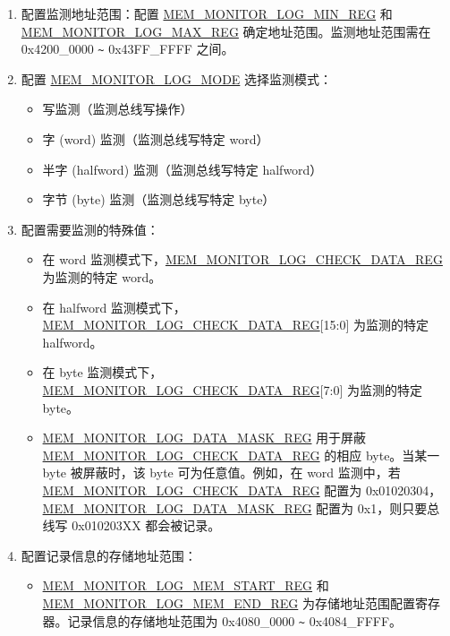 \documentclass[main\_\_CN.tex]{subfiles}
\begin{document}
\begin{enumerate}
    \item 配置监测地址范围：配置 \hyperref[regdesc:MEMMONITORLOGMINREG]{MEM\_MONITOR\_LOG\_MIN\_REG} 和 \hyperref[regdesc:MEMMONITORLOGMAXREG]{MEM\_MONITOR\_LOG\_MAX\_REG} 确定地址范围。监测地址范围需在 0x4200\_0000 \verb+~+ 0x43FF\_FFFF 之间。
    \item 配置 \hyperref[fielddesc:MEMMONITORLOGMODE]{MEM\_MONITOR\_LOG\_MODE} 选择监测模式：
        \begin{itemize}
            \item 写监测（监测总线写操作）
            \item 字 (word) 监测（监测总线写特定 word）
            \item 半字 (halfword) 监测（监测总线写特定 halfword）
            \item 字节 (byte) 监测（监测总线写特定 byte）
        \end{itemize}
    \item 配置需要监测的特殊值：
        \begin{itemize}
            \item 在 word 监测模式下，\hyperref[regdesc:MEMMONITORLOGCHECKDATAREG]{MEM\_MONITOR\_LOG\_CHECK\_DATA\_REG} 为监测的特定 word。
            \item 在 halfword 监测模式下，\hyperref[regdesc:MEMMONITORLOGCHECKDATAREG]{MEM\_MONITOR\_LOG\_CHECK\_DATA\_REG}[15:0] 为监测的特定 halfword。
            \item 在 byte 监测模式下，\hyperref[regdesc:MEMMONITORLOGCHECKDATAREG]{MEM\_MONITOR\_LOG\_CHECK\_DATA\_REG}[7:0] 为监测的特定 byte。
            \item \hyperref[regdesc:MEMMONITORLOGDATAMASKREG]{MEM\_MONITOR\_LOG\_DATA\_MASK\_REG} 用于屏蔽 \hyperref[regdesc:MEMMONITORLOGCHECKDATAREG]{MEM\_MONITOR\_LOG\_CHECK\_DATA\_REG} 的相应 byte。当某一 byte 被屏蔽时，该 byte 可为任意值。例如，在 word 监测中，若 \hyperref[regdesc:MEMMONITORLOGCHECKDATAREG]{MEM\_MONITOR\_LOG\_CHECK\_DATA\_REG} 配置为 0x01020304，\hyperref[regdesc:MEMMONITORLOGDATAMASKREG]{MEM\_MONITOR\_LOG\_DATA\_MASK\_REG} 配置为 0x1，则只要总线写 0x010203XX 都会被记录。
        \end{itemize}
    \item 配置记录信息的存储地址范围：
        \begin{itemize}
            \item \hyperref[regdesc:MEMMONITORLOGMEMSTARTREG]{MEM\_MONITOR\_LOG\_MEM\_START\_REG} 和 \hyperref[regdesc:MEMMONITORLOGMEMENDREG]{MEM\_MONITOR\_LOG\_MEM\_END\_REG} 为存储地址范围配置寄存器。记录信息的存储地址范围为 0x4080\_0000 \verb+~+ 0x4084\_FFFF。

\end{itemize}
\end{enumerate}
\end{document}
